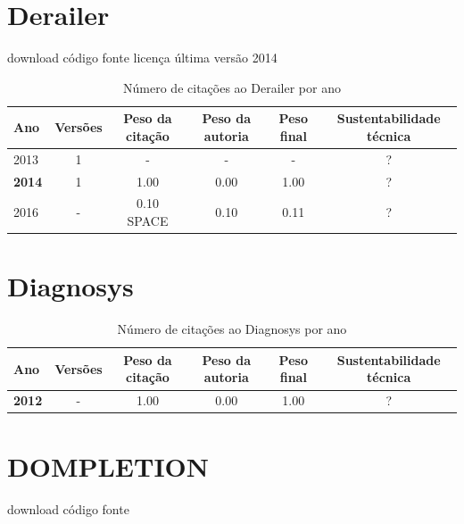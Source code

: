 \section{Derailer}
\checkmark download
\checkmark código fonte
\checkmark licença
\checkmark última versão 2014



\begin{table}[H]
\caption{Número de citações ao Derailer por ano}
\centering
\begin{tabular}{| l | c | c | c | c | c |}
  \hline
  Ano & Versões & Peso da citação & Peso da autoria & Peso final & Sustentabilidade técnica \\
  \hline
        2013 & 1 & - & - & - & ? \\
\hline
            {\bf 2014}
          &
          1
          &
          1.00
          &
          0.00
          &
            {\color{blue} 1.00}
          &
          ?
          \\
\hline
            2016
          &
          -
          &
          0.10
            {\tiny SPACE}
          &
          0.10
          &
            {\color{red} 0.11}
          &
          ?
          \\
\hline
\end{tabular}
\end{table}



\section{Diagnosys}



\begin{table}[H]
\caption{Número de citações ao Diagnosys por ano}
\centering
\begin{tabular}{| l | c | c | c | c | c |}
  \hline
  Ano & Versões & Peso da citação & Peso da autoria & Peso final & Sustentabilidade técnica \\
  \hline
            {\bf 2012}
          &
          -
          &
          1.00
          &
          0.00
          &
            {\color{blue} 1.00}
          &
          ?
          \\
\hline
\end{tabular}
\end{table}



\section{DOMPLETION}
\checkmark download
\checkmark código fonte



